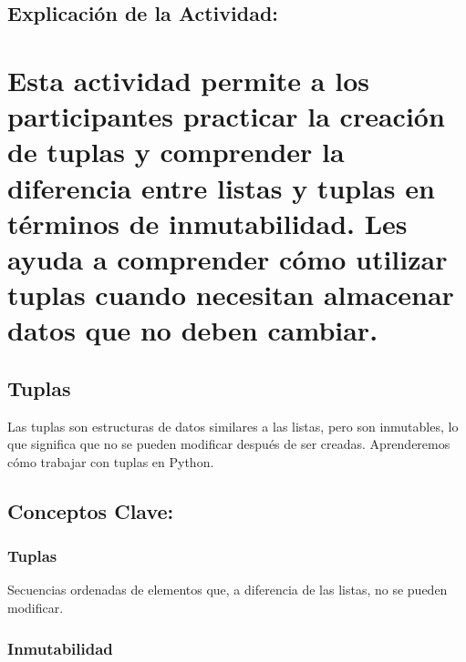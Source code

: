 \documentclass[
  a4paper,
  DIV=11,
  numbers=noendperiod,
  onepage,
  openany]{scrreprt}
\begin{document}
\hypertarget{explicaciuxf3n-de-la-actividad-18}{%
\section{Explicación de la
Actividad:}\label{explicaciuxf3n-de-la-actividad-18}}

\hypertarget{esta-actividad-permite-a-los-participantes-practicar-la-creaciuxf3n-de-tuplas-y-comprender-la-diferencia-entre-listas-y-tuplas-en-tuxe9rminos-de-inmutabilidad.-les-ayuda-a-comprender-cuxf3mo-utilizar-tuplas-cuando-necesitan-almacenar-datos-que-no-deben-cambiar.}{%
\chapter{Esta actividad permite a los participantes practicar la
creación de tuplas y comprender la diferencia entre listas y tuplas en
términos de inmutabilidad. Les ayuda a comprender cómo utilizar tuplas
cuando necesitan almacenar datos que no deben
cambiar.}\label{esta-actividad-permite-a-los-participantes-practicar-la-creaciuxf3n-de-tuplas-y-comprender-la-diferencia-entre-listas-y-tuplas-en-tuxe9rminos-de-inmutabilidad.-les-ayuda-a-comprender-cuxf3mo-utilizar-tuplas-cuando-necesitan-almacenar-datos-que-no-deben-cambiar.}}

\hypertarget{tuplas-2}{%
\section{Tuplas}\label{tuplas-2}}

Las tuplas son estructuras de datos similares a las listas, pero son
inmutables, lo que significa que no se pueden modificar después de ser
creadas. Aprenderemos cómo trabajar con tuplas en Python.

\hypertarget{conceptos-clave-21}{%
\section{Conceptos Clave:}\label{conceptos-clave-21}}

\hypertarget{tuplas-3}{%
\subsection{Tuplas}\label{tuplas-3}}

Secuencias ordenadas de elementos que, a diferencia de las listas, no se
pueden modificar.

\hypertarget{inmutabilidad-1}{%
\subsection{Inmutabilidad}\label{inmutabilidad-1}}
\end{document}
